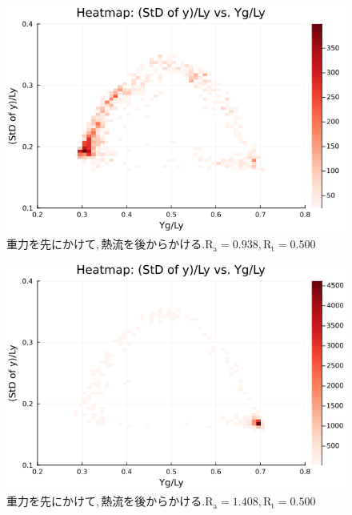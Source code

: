 \begin{figure}[H]
  \centering
  \includegraphics[scale=0.6]{image/RaRtmap_drop_heat/2023-12-21T10:44:58.788_RaRtmap_chi1.265_Ay50_rho0.4_T0.43_dT0.04_Rd0.0_Rt0.5_Ra0.938769_g0.0003999718779659611_run4.0e7.png}
  \caption{$重力を先にかけて, 熱流を後からかける. \text{R}_\text{a}=0.938,\text{R}_\text{t}=0.500$}
  \label{}
\end{figure}

\begin{figure}[H]
  \centering
  \includegraphics[scale=0.6]{image/RaRtmap_drop_heat/2023-12-21T10:44:58.872_RaRtmap_chi1.265_Ay50_rho0.4_T0.43_dT0.04_Rd0.0_Rt0.5_Ra1.4081535_g0.0003999718779659611_run4.0e7.png}
  \caption{$重力を先にかけて, 熱流を後からかける. \text{R}_\text{a}=1.408,\text{R}_\text{t}=0.500$}
  \label{}
\end{figure}

